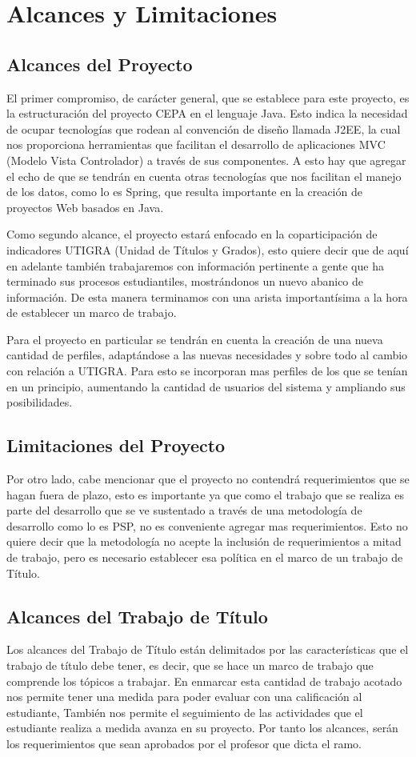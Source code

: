 \documentclass[a4paper,12pt,openany,oneside]{book}
\begin{document}
\chapter{Alcances y Limitaciones}
\thispagestyle{empty}
\section{Alcances del Proyecto}
El primer compromiso, de carácter general, que se establece para este proyecto, es la estructuración del proyecto CEPA en el lenguaje Java. Esto indica la necesidad de ocupar tecnologías que rodean al convención de diseño llamada J2EE, la cual nos proporciona herramientas que facilitan el desarrollo de aplicaciones MVC (Modelo Vista Controlador) a través de sus componentes. A esto hay que agregar el echo de que se tendrán en cuenta otras tecnologías que nos facilitan el manejo de los datos, como lo es Spring, que resulta importante en la creación de proyectos Web basados en Java.

Como segundo alcance, el proyecto estará enfocado en la coparticipación de indicadores UTIGRA (Unidad de Títulos y Grados), esto quiere decir que de aquí en adelante también trabajaremos con información pertinente a gente que ha terminado sus procesos estudiantiles, mostrándonos un nuevo abanico de información. De esta manera terminamos con una arista importantísima a la hora de establecer un marco de trabajo.

Para el proyecto en particular se tendrán en cuenta la creación de una nueva cantidad de perfiles, adaptándose a las nuevas necesidades y sobre todo al cambio con relación a UTIGRA. Para esto se incorporan mas perfiles de los que se tenían en un principio, aumentando la cantidad de usuarios del sistema y ampliando sus posibilidades.
\section{Limitaciones del Proyecto}
Por otro lado, cabe mencionar que el proyecto no contendrá requerimientos que se hagan fuera de plazo, esto es importante ya que como el trabajo que se realiza es parte del desarrollo que se ve sustentado a través de una metodología de desarrollo como lo es PSP, no es conveniente agregar mas requerimientos. Esto no quiere decir que la metodología no acepte la inclusión de requerimientos a mitad de trabajo, pero es necesario establecer esa política en el marco de un trabajo de Título.
\section{Alcances del Trabajo de Título}
Los alcances del Trabajo de Título están delimitados por las características que el trabajo de título debe tener, es decir, que se hace un marco de trabajo que comprende los tópicos a trabajar. En enmarcar esta cantidad de trabajo acotado nos permite tener una medida para poder evaluar con una calificación al estudiante, También nos permite el seguimiento de las actividades que el estudiante realiza a medida avanza en su proyecto. Por tanto los alcances, serán los requerimientos que sean aprobados por el profesor que dicta el ramo.
\end{document}
